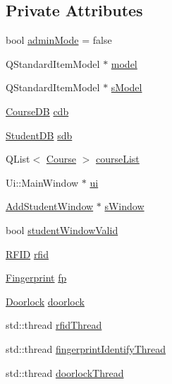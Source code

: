 \subsection*{Private Attributes}
\begin{DoxyCompactItemize}
\item 
bool \hyperlink{class_main_window_af5c03c6632d910a4a733ff21f5613cc5}{admin\+Mode} = false
\item 
Q\+Standard\+Item\+Model $\ast$ \hyperlink{class_main_window_aa1a1f8ce9c37a7ac70d21402759638b3}{model}
\item 
Q\+Standard\+Item\+Model $\ast$ \hyperlink{class_main_window_a9e29f365cc9fb25a1fa34c8ea81e406b}{s\+Model}
\item 
\hyperlink{class_course_d_b}{Course\+D\+B} \hyperlink{class_main_window_a38cdde30de1c2211dc81a739ed1af6aa}{cdb}
\item 
\hyperlink{class_student_d_b}{Student\+D\+B} \hyperlink{class_main_window_a36cba3be5ce45e891732fc37f909f160}{sdb}
\item 
Q\+List$<$ \hyperlink{struct_course}{Course} $>$ \hyperlink{class_main_window_a0c800a8b8fe1c75097adf279dc1dfc85}{course\+List}
\item 
Ui\+::\+Main\+Window $\ast$ \hyperlink{class_main_window_a35466a70ed47252a0191168126a352a5}{ui}
\item 
\hyperlink{class_add_student_window}{Add\+Student\+Window} $\ast$ \hyperlink{class_main_window_aad218c6ea271c5f52b8b9f8772b51e23}{s\+Window}
\item 
bool \hyperlink{class_main_window_a222458b690e6b51b1fd78f24475743e8}{student\+Window\+Valid}
\item 
\hyperlink{class_r_f_i_d}{R\+F\+I\+D} \hyperlink{class_main_window_a3731e42d8e85714bda210c44605974df}{rfid}
\item 
\hyperlink{class_fingerprint}{Fingerprint} \hyperlink{class_main_window_ae9b267fa7badc7c10d9f03ab6dd99a21}{fp}
\item 
\hyperlink{class_doorlock}{Doorlock} \hyperlink{class_main_window_a1238bb71f8626ea3d2423c70bce5424e}{doorlock}
\item 
std\+::thread \hyperlink{class_main_window_a34e32ec4b55f9259776c82da9c7364ac}{rfid\+Thread}
\item 
std\+::thread \hyperlink{class_main_window_ae27e65bcfce4d59fd1b51328b44e5a3f}{fingerprint\+Identify\+Thread}
\item 
std\+::thread \hyperlink{class_main_window_a7e5c1368e92535153288333135ab9c1f}{doorlock\+Thread}
\item 

\end{DoxyCompactItemize}
